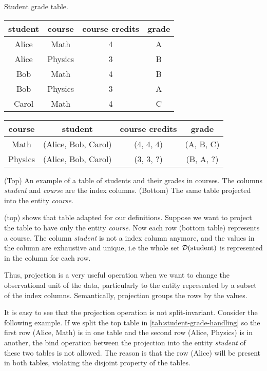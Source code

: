 \begin{tablebox}[label=tab:student-grade-handling]{Student grade table.}
  \centering
  \begin{tabular}{cccc}
    \toprule
    \textbf{student} & \textbf{course} & \textbf{course credits} & \textbf{grade} \\
    \midrule
    Alice & Math & 4 & A \\
    Alice & Physics & 3 & B \\
    Bob & Math & 4 & B \\
    Bob & Physics & 3 & A \\
    Carol & Math & 4 & C \\
    \bottomrule
  \end{tabular}

  \vspace{1em}
  \begin{tabular}{cccc}
    \toprule
    \textbf{course} & \textbf{student} & \textbf{course credits} & \textbf{grade} \\
    \midrule
    Math & (Alice, Bob, Carol) & (4, 4, 4) & (A, B, C) \\
    Physics & (Alice, Bob, Carol) & (3, 3, ?) & (B, A, ?) \\
    \bottomrule
  \end{tabular}
  \tcblower
  (Top) An example of a table of students and their grades in courses.  The columns
  \emph{student} and \emph{course} are the index columns. (Bottom) The same table
  projected into the entity \emph{course}.
\end{tablebox}

 (top) shows that table adapted for our definitions.
Suppose we want to project the table to have only the entity \emph{course}.
Now each row (bottom table) represents a course.  The column \emph{student} is not a
index column anymore, and the values in the column are exhaustive and unique, i.e
the whole set $\mathcal{D}\!\left(\text{student}\right)$ is represented in the column for each row.

Thus, projection is a very useful operation when we want to change the observational unit
of the data, particularly to the entity represented by a subset of the index columns.
Semantically, projection groups the rows by the values.

It is easy to see that the projection operation is not split-invariant.  Consider the
following example. If we split the top table in \cref{tab:student-grade-handling} so the
first row (Alice, Math) is in one table and the second row (Alice, Physics) is in another,
the bind operation between the projection into the entity \emph{student} of these two
tables is not allowed.  The reason is that the row (Alice) will be present in both tables,
violating the disjoint property of the tables.

